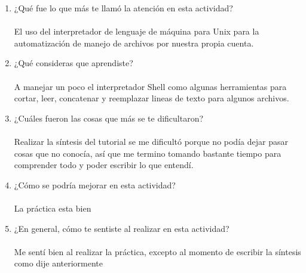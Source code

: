 \documentclass{article}
\begin{document}
\begin{enumerate}
\item ¿Qué fue lo que más te llamó la atención en esta actividad? ~\\~\\
El uso del interpretador de lenguaje de máquina para Unix para la automatización de manejo de archivos por nuestra propia cuenta.

\item ¿Qué consideras que aprendiste? ~\\~\\
A manejar un poco el interpretador Shell como algunas herramientas para cortar, leer, concatenar y reemplazar lineas de texto para algunos archivos.

\item ¿Cuáles fueron las cosas que más se te dificultaron? ~\\~\\
Realizar la síntesis del tutorial se me dificultó porque no podía dejar pasar cosas que no conocía, así que me termino tomando bastante tiempo para comprender todo y poder escribir lo que entendí.

\item ¿Cómo se podría mejorar en esta actividad? ~\\~\\
La práctica esta bien

\item ¿En general, cómo te sentiste al realizar en esta actividad? ~\\~\\
Me sentí bien al realizar la práctica, excepto al momento de escribir la síntesis como dije anteriormente

\end{enumerate}
\end{document}
